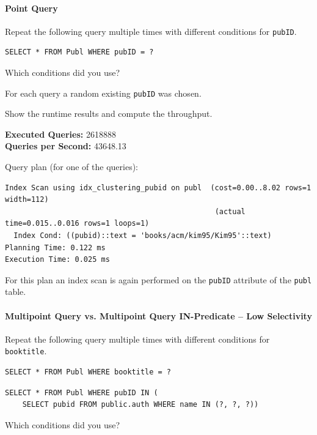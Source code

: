 \documentclass[11pt]{scrartcl}
\begin{document}
\paragraph{Point Query}

Repeat the following query multiple times with different conditions for \texttt{pubID}.

\begin{lstlisting}[style=dbtsql]
SELECT * FROM Publ WHERE pubID = ?
\end{lstlisting}

Which conditions did you use?

For each query a random existing \texttt{pubID} was chosen.

Show the runtime results and compute the throughput.

\textbf{Executed Queries: } 2618888\\
\textbf{Queries per Second: } 43648.13

Query plan (for one of the queries):

{\small
\parskip0pt\begin{verbatim}
Index Scan using idx_clustering_pubid on publ  (cost=0.00..8.02 rows=1 width=112)
                                                (actual time=0.015..0.016 rows=1 loops=1)
  Index Cond: ((pubid)::text = 'books/acm/kim95/Kim95'::text)
Planning Time: 0.122 ms
Execution Time: 0.025 ms
\end{verbatim}}

For this plan an index scan is again performed on the \texttt{pubID} attribute of the \texttt{publ} table.

\paragraph{Multipoint Query vs. Multipoint Query IN-Predicate -- Low Selectivity}

Repeat the following query multiple times with different conditions for \texttt{booktitle}.

\begin{lstlisting}[style=dbtsql]
SELECT * FROM Publ WHERE booktitle = ?
\end{lstlisting}

\begin{lstlisting}[style=dbtsql]
SELECT * FROM Publ WHERE pubID IN (
    SELECT pubid FROM public.auth WHERE name IN (?, ?, ?))
\end{lstlisting}


Which conditions did you use?
\end{document}
